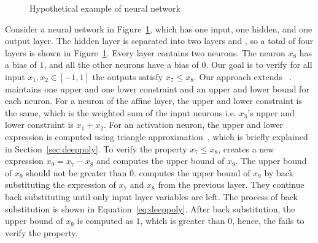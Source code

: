 \begin{figure}[t]
	\centering
	\scalebox{0.8}{}
	\caption{Hypothetical example of neural network}
	\label{fig:motivating}
\end{figure}
Consider a neural network in Figure~\ref{fig:motivating},  which has one input, one hidden, and one output layer. The hidden layer is separated into two layers 
\affine{} and \relu{}, so a total of four layers is shown in Figure~\ref{fig:motivating}. 
Every layer contains two neurons. The neuron $x_8$ has a bias of $1$, and all the other neurons have a bias of $0$. 
Our goal is to verify for all input $x_1,x_2 \in [-1,1]$ the outputs satisfy $x_7 \leq x_8$. 
Our approach extends \deeppoly{}~\cite{singh2019abstract}.
\deeppoly{} maintains one upper and
one lower constraint and an upper and lower bound for each neuron.
For a neuron of the affine layer, the upper and lower constraint is 
the same, which is the weighted sum of the input neurons i.e. $x_3$'s upper and lower constraint is $x_1+x_2$.
For an activation neuron, the upper and lower expression is computed using triangle approximation~\cite{singh2019abstract}, 
which is briefly explained in Section~\ref{sec:deeppoly}. To verify the property $x_7 \leq x_8$, \deeppoly{} creates a 
new expression $x_9 = x_7 - x_8$ and computes the upper bound of $x_9$. The upper bound of $x_9$ should not be greater
than $0$. \deeppoly{} computes the upper bound of $x_9$ by back substituting the expression of $x_7$ and $x_8$ 
from the previous layer.
They continue back substituting until only input layer variables are left.
The process of back substitution is shown in Equation~\ref{eq:deeppoly}.
After back substitution, the upper bound of $x_9$ is
computed as $1$, which is greater than $0$, 
hence, the \deeppoly{} fails to verify the property.

